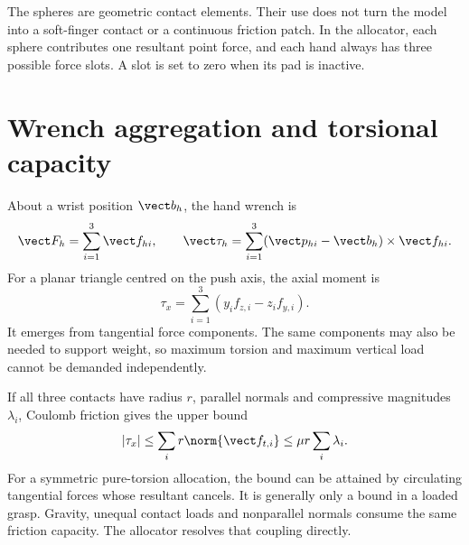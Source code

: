

The spheres are geometric contact elements. Their use does not turn the model into a soft-finger contact or a continuous friction patch. In the allocator, each sphere contributes one resultant point force, and each hand always has three possible force slots. A slot is set to zero when its pad is inactive.

\section{Wrench aggregation and torsional capacity}

About a wrist position $\vect b_h$, the hand wrench is
\begin{equation}
\vect F_h=\sum_{i=1}^3\vect f_{hi},\qquad
\vect\tau_h=\sum_{i=1}^3(\vect p_{hi}-\vect b_h)\times\vect f_{hi}.
\label{eq:hand-wrench}
\end{equation}
For a planar triangle centred on the push axis, the axial moment is
\begin{equation}
\tau_x=\sum_{i=1}^3(y_i f_{z,i}-z_i f_{y,i}).
\end{equation}
It emerges from tangential force components. The same components may also be needed to support weight, so maximum torsion and maximum vertical load cannot be demanded independently.

If all three contacts have radius $r$, parallel normals and compressive magnitudes $\lambda_i$, Coulomb friction gives the upper bound
\begin{equation}
|\tau_x|\leq \sum_i r\norm{\vect f_{t,i}}
\leq\mu r\sum_i\lambda_i.
\label{eq:torsion-bound}
\end{equation}
For a symmetric pure-torsion allocation, the bound can be attained by circulating tangential forces whose resultant cancels. It is generally only a bound in a loaded grasp. Gravity, unequal contact loads and nonparallel normals consume the same friction capacity. The allocator resolves that coupling directly.

